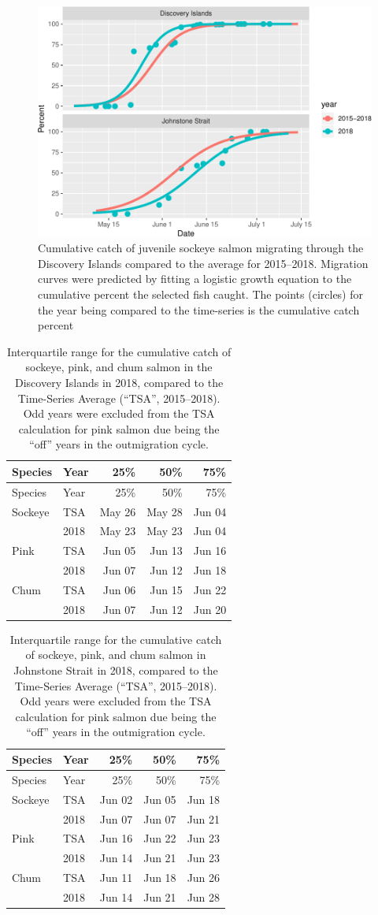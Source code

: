 \documentclass[fleqn,10pt]{wlpeerj} %
\begin{document}
\begin{figure}[H]
\includegraphics[width=0.8\linewidth]{peer_j_migration_dynamics_files/figure-latex/mt-1} \caption{Cumulative catch of juvenile sockeye salmon migrating through the Discovery Islands compared to the average for 2015--2018. Migration curves were predicted by fitting a logistic growth equation to the cumulative percent the selected fish caught. The points (circles) for the year being compared to the time-series is the cumulative catch percent}\label{fig:mt}
\end{figure}

\begin{longtable}[]{@{}llrrr@{}}
\caption{\label{tab:mtdi} Interquartile range for the cumulative catch of
sockeye, pink, and chum salmon in the Discovery Islands in 2018,
compared to the Time-Series Average (``TSA'', 2015--2018). Odd years
were excluded from the TSA calculation for pink salmon due being the
``off'' years in the outmigration cycle.}\tabularnewline
\toprule
Species & Year & 25\% & 50\% & 75\%\tabularnewline
\midrule
\endfirsthead
\toprule
Species & Year & 25\% & 50\% & 75\%\tabularnewline
\midrule
\endhead
Sockeye & TSA & May 26 & May 28 & Jun 04\tabularnewline
~ & 2018 & May 23 & May 23 & Jun 04\tabularnewline
Pink & TSA & Jun 05 & Jun 13 & Jun 16\tabularnewline
~ & 2018 & Jun 07 & Jun 12 & Jun 18\tabularnewline
Chum & TSA & Jun 06 & Jun 15 & Jun 22\tabularnewline
~ & 2018 & Jun 07 & Jun 12 & Jun 20\tabularnewline
\bottomrule
\end{longtable}

\begin{longtable}[]{@{}llrrr@{}}
\caption{\label{tab:mtjs} Interquartile range for the cumulative catch of
sockeye, pink, and chum salmon in Johnstone Strait in 2018, compared to
the Time-Series Average (``TSA'', 2015--2018). Odd years were excluded
from the TSA calculation for pink salmon due being the ``off'' years in
the outmigration cycle.}\tabularnewline
\toprule
Species & Year & 25\% & 50\% & 75\%\tabularnewline
\midrule
\endfirsthead
\toprule
Species & Year & 25\% & 50\% & 75\%\tabularnewline
\midrule
\endhead
Sockeye & TSA & Jun 02 & Jun 05 & Jun 18\tabularnewline
~ & 2018 & Jun 07 & Jun 07 & Jun 21\tabularnewline
Pink & TSA & Jun 16 & Jun 22 & Jun 23\tabularnewline
~ & 2018 & Jun 14 & Jun 21 & Jun 23\tabularnewline
Chum & TSA & Jun 11 & Jun 18 & Jun 26\tabularnewline
~ & 2018 & Jun 14 & Jun 21 & Jun 28\tabularnewline
\bottomrule
\end{longtable}
\end{document}
